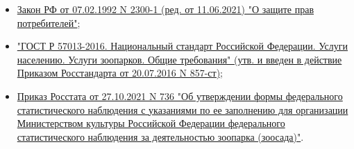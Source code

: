 \documentclass[12pt, a4paper]{article}
\begin{document}
\begin{itemize}
    \item \href{https://student2.consultant.ru/cgi/online.cgi?req=doc&base=LAW&n=373488&dst=0#Gf5ur1TPkK5LgmbH}{Закон РФ от 07.02.1992 N 2300-1 (ред. от 11.06.2021) "О защите прав потребителей"};
    
    \item \href{https://docs.cntd.ru/document/1200137228}{"ГОСТ Р 57013-2016. Национальный стандарт Российской Федерации. Услуги населению. Услуги зоопарков. Общие требования" (утв. и введен в действие Приказом Росстандарта от 20.07.2016 N 857-ст)};
    
    \item \href{https://student2.consultant.ru/cgi/online.cgi?req=doc&rnd=XbcvLw&base=LAW&n=399590&dst=100013&field=134#2855r1TgPC7pc4QA1}{Приказ Росстата от 27.10.2021 N 736 "Об утверждении формы федерального статистического наблюдения с указаниями по ее заполнению для организации Министерством культуры Российской Федерации федерального статистического наблюдения за деятельностью зоопарка (зоосада)"}.
\end{itemize}
\end{document}
